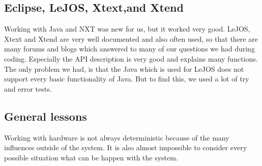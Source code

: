\documentclass[11pt,a4paper]{article}
\begin{document}
\subsection{Eclipse, LeJOS, Xtext,and Xtend}
Working with Java and NXT was new for us, but it worked very good. LeJOS, Xtext and Xtend are very well documented and also often used, so that there are many forums and blogs which answered to many of our questions we had during coding. Especially the API description is very good and explains many functions.\\
The only problem we had, is that the Java which is used for LeJOS does not support every basic functionality of Java. But to find this, we used a lot of try and error tests. 

\subsection{General lessons}
Working with hardware is not always deterministic because of the many influences outside of the system. It is also almost impossible to consider every possible situation what can be happen with the system. 
\end{document}
